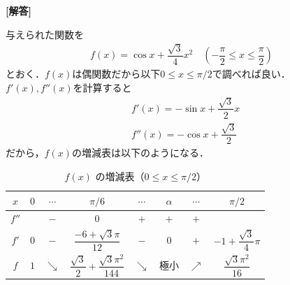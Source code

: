 \documentclass[../../main.tex]{subfiles}
\begin{document}
\begin{oframed}
  
\end{oframed}

{\bf [解答]}

与えられた関数を
\begin{align}
  f(x)=\cos x+\dfrac{\sqrt{3}}{4}x^2 \quad \left(-\dfrac{\pi}{2} \le x \le \dfrac{\pi}{2}\right)
\end{align}
とおく．$f(x)$は偶関数だから以下$0\le x\le\pi/2$で調べれば良い．
$f'(x), f''(x)$を計算すると
\begin{align}
  & f'(x)=-\sin x +\dfrac{\sqrt{3}}{2}x \\
  & f''(x)=-\cos x + \dfrac{\sqrt{3}}{2}
\end{align}
だから，$f(x)$の増減表は以下のようになる．

\begin{table}[htb]
  \centering
  \caption{$f(x)$ の増減表（$0 \le x \le \pi/2$）}
  \label{tab:variation}
  \begin{tabular}{|c|c|c|c|c|c|c|c|}
    \hline
    $x$ & $0$ & $\cdots$ & $\pi/6$ & $\cdots$ & $\alpha$ & $\cdots$ & $\pi/2$ \\
    \hline
    $f''$ & & $-$ & $0$ & $+$ & $+$ & $+$ & \\
    \hline
    $f'$ & $0$ & $-$ & $\dfrac{-6+\sqrt{3}\pi}{12}$ & $-$ & $0$ & $+$ & $-1+\dfrac{\sqrt{3}}{4}\pi$ \\
    \hline
    $f$ & $1$ & $\searrow$ & $\dfrac{\sqrt{3}}{2}+\dfrac{\sqrt{3}\pi^2}{144}$ & $\searrow$ & 極小 & $\nearrow$ & $\dfrac{\sqrt{3}\pi^2}{16}$ \\
    \hline
  \end{tabular}
\end{table}
\end{document}
